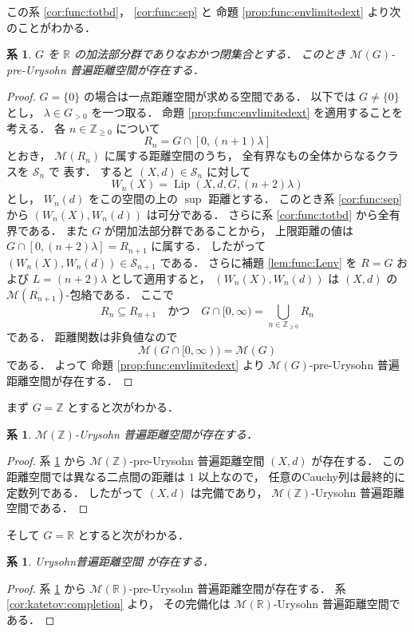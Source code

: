 \documentclass[leqno, 12pt]{jsarticle}
\newtheorem{cor}[thm]{系}
\newcommand{\zz}{\mathbb{Z}}
\newcommand{\yozz}[1]{\zz_{\ge #1}}
\newcommand{\rr}{\mathbb{R}}
\DeclareMathOperator{\lip}{Lip}
\newcommand{\Met}[1]{\mathscr{M}(#1)}
\newcommand{\LipSpace}[4]{\lip(#1,#2,#3,#4)}
\newcommand{\pospart}[1]{#1_{>0}}
\begin{document}
この系
 \ref{cor:func:totbd}，
  \ref{cor:func:sep}
  と
命題
\ref{prop:func:envlimitedext}
より次のことがわかる．
\begin{cor}\label{cor:func:gromov-closed}
$G$
を
$\rr$
の加法部分群でありなおかつ閉集合とする．
このとき
$\Met{G}$-pre-Urysohn
普遍距離空間が存在する．
\end{cor}
\begin{proof}
$G=\{0\}$
の場合は一点距離空間が求める空間である．
以下では
$G\neq\{0\}$
とし，
$\lambda\in\pospart{G}$
を一つ取る．
命題
\ref{prop:func:envlimitedext}
を適用することを考える．
各
$n\in \yozz{0}$%
について
\[
R_n=G\cap[0,(n+1)\lambda]
\]
とおき，
$\Met{R_n}$
に属する距離空間のうち，
全有界なもの全体からなるクラスを
$\mathscr{S}_{n}$%
で
表す．
すると
$(X, d)\in \mathscr{S}_{n}$
に対して
\[
W_{n}(X)=\LipSpace{X}{d}{G}{(n+2)\lambda}
\]
とし，
$W_{n}(d)$
をこの空間の上の
$\sup$
距離とする．
このとき系
\ref{cor:func:sep}
から
$(W_{n}(X), W_{n}(d))$
は可分である．
さらに系
\ref{cor:func:totbd}
から全有界である．
また
$G$
が閉加法部分群であることから，
上限距離の値は
$G\cap[0,(n+2)\lambda]=R_{n+1}$
に属する．
したがって
$(W_{n}(X), W_{n}(d))\in \mathscr{S}_{n+1}$
である．
さらに補題
\ref{lem:func:Lenv}
を
$R=G$
および
$L=(n+2)\lambda$
として適用すると，
$(W_n(X),W_n(d))$
は
$(X,d)$
の
$\Met{R_{n+1}}$-包絡である．
ここで
\[
R_n\subseteq R_{n+1}
\quad\text{かつ}\quad
G\cap[0,\infty)
=
\bigcup_{n\in\yozz{0}}R_n
\]
である．
距離関数は非負値なので
\[
\Met{G\cap[0,\infty)}=\Met{G}
\]
である．
よって
命題
\ref{prop:func:envlimitedext}
より
$\Met{G}$-pre-Urysohn
普遍距離空間が存在する．
\end{proof}


まず
$G=\zz$
とすると次がわかる．
\begin{cor}\label{cor:func:gromovint}
$\Met{\zz}$-Urysohn
普遍距離空間が存在する．
\end{cor}
\begin{proof}
系
\ref{cor:func:gromov-closed}
から
$\Met{\zz}$-pre-Urysohn
普遍距離空間
$(X,d)$
が存在する．
この距離空間では異なる二点間の距離は
$1$
以上なので，
任意のCauchy列は最終的に定数列である．
したがって
$(X,d)$
は完備であり，
$\Met{\zz}$-Urysohn
普遍距離空間である．
\end{proof}


そして
$G=\rr$
とすると次がわかる．
\begin{cor}\label{cor:func:gromovUrysohn}
Urysohn普遍距離空間
が存在する．
\end{cor}
\begin{proof}
系
\ref{cor:func:gromov-closed}
から
$\Met{\rr}$-pre-Urysohn
普遍距離空間が存在する．
系
\ref{cor:katetov:completion}
より，
その完備化は
$\Met{\rr}$-Urysohn
普遍距離空間である．
\end{proof}
\end{document}
